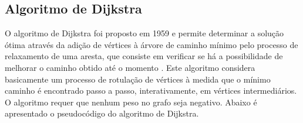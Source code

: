 \subsection{Algoritmo de Dijkstra}
O algoritmo de Dijkstra foi proposto em 1959 e permite determinar a solução ótima através da adição de
vértices à árvore de caminho mínimo pelo processo de relaxamento de uma aresta, que consiste em verificar
se há a possibilidade de melhorar o caminho obtido até o momento \cite{boaventura}. Este algoritmo considera
basicamente um processo de rotulação de vértices à medida que o mínimo caminho é encontrado passo a passo,
interativamente, em vértices intermediários. O algoritmo requer que nenhum peso no grafo seja negativo. Abaixo
é apresentado o pseudocódigo do algoritmo de Dijkstra.
\FloatBarrier
{}
